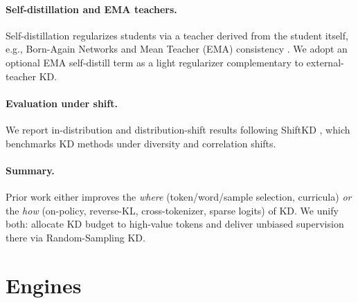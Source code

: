 \documentclass[11pt]{article}
\begin{document}
\paragraph{Self-distillation and EMA teachers.} Self-distillation regularizes students via a teacher derived from the student itself, e.g., Born-Again Networks \citep{furlanello2018ban} and Mean Teacher (EMA) consistency \citep{tarvainen2017meanteacher}. We adopt an optional EMA self-distill term as a light regularizer complementary to external-teacher KD.

\paragraph{Evaluation under shift.} We report in-distribution and distribution-shift results following ShiftKD \citep{zhang2023shiftkd}, which benchmarks KD methods under diversity and correlation shifts.

\paragraph{Summary.} Prior work either improves the \emph{where} (token/word/sample selection, curricula) \emph{or} the \emph{how} (on-policy, reverse-KL, cross-tokenizer, sparse logits) of KD. We unify both: allocate KD budget to high-value tokens and deliver unbiased supervision there via Random-Sampling KD.




\section{Engines}
\end{document}

